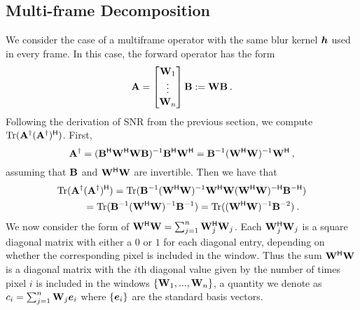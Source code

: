 \subsection{Multi-frame Decomposition}\label{sec:multiframe_app}

We consider the case of a multiframe operator with the same blur kernel $\bm{h}$ used in every frame. In this case, the forward operator has the form
\begin{equation*}
\mathbf{A} =  \begin{bmatrix}\mathbf{W}_1 \\ \vdots \\ \mathbf{W}_n \end{bmatrix}\mathbf{B} := \mathbf{W}\mathbf{B}\:.
\end{equation*}
 Following the derivation of SNR from the previous section, we compute $\mathrm{Tr}(\mathbf{A}^\dagger (\mathbf{A}^\dagger)^{\mathsf{H}})$. First,
\[\mathbf{A}^\dagger = (\mathbf{B}^{\mathsf{H}} {\mathbf{W}}^{\mathsf{H}}{\mathbf{W}} \mathbf{B})^{-1} \mathbf{B}^{\mathsf{H}} {\mathbf{W}}^{\mathsf{H}} =
\mathbf{B}^{-1} ({\mathbf{W}}^{\mathsf{H}}{\mathbf{W}} )^{-1} {\mathbf{W}}^{\mathsf{H}}\:,\]
assuming that $\mathbf{B}$ and $\mathbf{W}^{\mathsf{H}} \mathbf{W}$ are invertible.
Then we have that
\begin{align*}
    \mathrm{Tr}(\mathbf{A}^\dagger &(\mathbf{A}^\dagger)^{\mathsf{H}}) = \mathrm{Tr}(\mathbf{B}^{-1} ({\mathbf{W}}^{\mathsf{H}}{\mathbf{W}} )^{-1} {\mathbf{W}}^{\mathsf{H}} {\mathbf{W}} ({\mathbf{W}}^{\mathsf{H}}{\mathbf{W}} )^{-\mathsf{H}}
    \mathbf{B}^{-\mathsf{H}}) \\
    &= \mathrm{Tr}(\mathbf{B}^{-1} ({\mathbf{W}}^{\mathsf{H}}{\mathbf{W}} )^{-1}
    \mathbf{B}^{-1}) = \mathrm{Tr}(({\mathbf{W}}^{\mathsf{H}}{\mathbf{W}} )^{-1} \mathbf{B}^{-2} )\:.
\end{align*}
We now consider the form of ${\mathbf{W}}^{\mathsf{H}}{\mathbf{W}} = \sum_{j=1}^n \mathbf{W}_j^{\mathsf{H}} \mathbf{W}_j$. Each $\mathbf{W}_j^{\mathsf{H}} \mathbf{W}_j$ is a square diagonal matrix with either a $0$ or $1$ for each diagonal entry, depending on whether the corresponding pixel is included in the window. Thus the sum ${\mathbf{W}}^{\mathsf{H}} {\mathbf{W}}$ is a diagonal matrix with the $i$th diagonal value given by the number of times pixel $i$ is included in the windows $\{\mathbf{W}_1,...,\mathbf{W}_n\}$, a quantity we denote as $c_i = \sum_{j=1}^n \mathbf{W}_j \bm{e}_i$ where $\{\bm{e}_i\}$ are the standard basis vectors.

